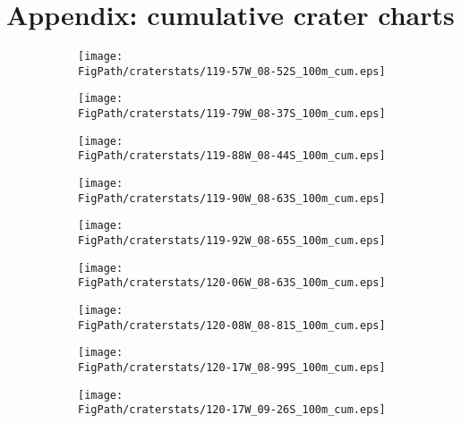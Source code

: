 %
%

 

\section{Appendix: cumulative crater charts}\label{sec_cccharts}
\begin{figure}[h]
\centering
\caption[Individual Cumulative crater frequency distributions]{Individual Cumulative crater frequency distributions}
\begin{subfigure}{.33\textwidth}
  \texttt{[image: \\FigPath/craterstats/119-57W\_08-52S\_100m\_cum.eps]}
\end{subfigure}%
\begin{subfigure}{.33\textwidth}
  \texttt{[image: \\FigPath/craterstats/119-79W\_08-37S\_100m\_cum.eps]}
\end{subfigure}
\begin{subfigure}{.33\textwidth}
  \texttt{[image: \\FigPath/craterstats/119-88W\_08-44S\_100m\_cum.eps]}
\end{subfigure}
\begin{subfigure}{.33\textwidth}
  \texttt{[image: \\FigPath/craterstats/119-90W\_08-63S\_100m\_cum.eps]}
\end{subfigure}%
\begin{subfigure}{.33\textwidth}
  \texttt{[image: \\FigPath/craterstats/119-92W\_08-65S\_100m\_cum.eps]}
\end{subfigure}
\begin{subfigure}{.33\textwidth}
  \texttt{[image: \\FigPath/craterstats/120-06W\_08-63S\_100m\_cum.eps]}
\end{subfigure}
\begin{subfigure}{.33\textwidth}
  \texttt{[image: \\FigPath/craterstats/120-08W\_08-81S\_100m\_cum.eps]}
\end{subfigure}%
\begin{subfigure}{.33\textwidth}
  \texttt{[image: \\FigPath/craterstats/120-17W\_08-99S\_100m\_cum.eps]}
\end{subfigure}
\begin{subfigure}{.33\textwidth}
  \texttt{[image: \\FigPath/craterstats/120-17W\_09-26S\_100m\_cum.eps]}
\end{subfigure}
\end{figure}

